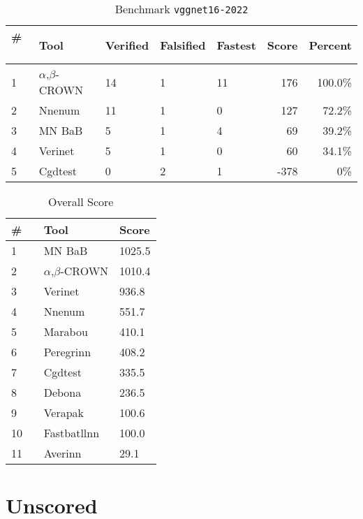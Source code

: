 
\begin{table}[h]
\begin{center}
\caption{Benchmark \texttt{vggnet16-2022}} \label{tab:cat_{cat}}
{\setlength{\tabcolsep}{2pt}
\begin{tabular}[h]{@{}lllllrr@{}}
\toprule
\textbf{\# ~} & \textbf{Tool} & \textbf{Verified} & \textbf{Falsified} & \textbf{Fastest} & \textbf{Score} & \textbf{Percent}\\
\midrule
1 & $\alpha$,$\beta$-CROWN & 14 & 1 & 11 & 176 & 100.0\% \\
2 & Nnenum & 11 & 1 & 0 & 127 & 72.2\% \\
3 & MN BaB & 5 & 1 & 4 & 69 & 39.2\% \\
4 & Verinet & 5 & 1 & 0 & 60 & 34.1\% \\
5 & Cgdtest & 0 & 2 & 1 & -378 & 0\% \\
\bottomrule
\end{tabular}
}
\end{center}
\end{table}




\begin{table}[h]
\begin{center}
\caption{Overall Score} \label{tab:score}
{\setlength{\tabcolsep}{2pt}
\begin{tabular}[h]{@{}lll@{}}
\toprule
\textbf{\# ~} & \textbf{Tool} & \textbf{Score}\\
\midrule
1 & MN BaB & 1025.5 \\
2 & $\alpha$,$\beta$-CROWN & 1010.4 \\
3 & Verinet & 936.8 \\
4 & Nnenum & 551.7 \\
5 & Marabou & 410.1 \\
6 & Peregrinn & 408.2 \\
7 & Cgdtest & 335.5 \\
8 & Debona & 236.5 \\
9 & Verapak & 100.6 \\
10 & Fastbatllnn & 100.0 \\
11 & Averinn & 29.1 \\
\bottomrule
\end{tabular}
}
\end{center}
\end{table}

\section{Unscored}

